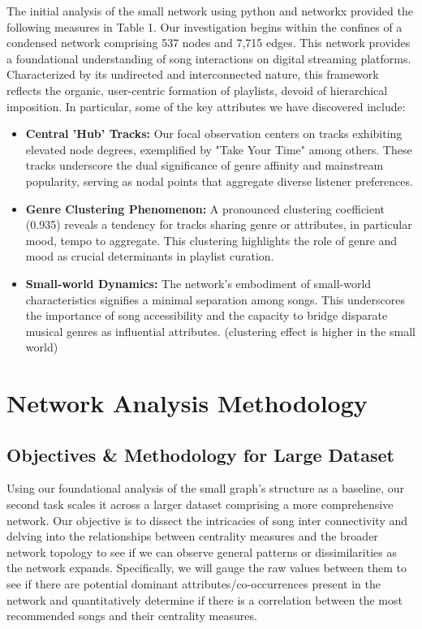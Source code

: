 \documentclass[conference]{IEEEtran}
\begin{document}
The initial analysis of the small network using python and networkx provided the following measures in Table 1. Our investigation begins within the confines of a condensed network comprising 537 nodes and 7,715 edges. This network provides a foundational understanding of song interactions on digital streaming platforms. Characterized by its undirected and interconnected nature, this framework reflects the organic, user-centric formation of playlists, devoid of hierarchical imposition. In particular, some of the key attributes we have discovered include: \\

\begin{itemize}
    \item\textbf{Central 'Hub' Tracks:} Our focal observation centers on tracks exhibiting elevated node degrees, exemplified by "Take Your Time" among others. These tracks underscore the dual significance of genre affinity and mainstream popularity, serving as nodal points that aggregate diverse listener preferences. \\
    
    \item\textbf{Genre Clustering Phenomenon:} A pronounced clustering coefficient (0.935) reveals a tendency for tracks sharing genre or attributes, in particular mood, tempo to aggregate. This clustering highlights the role of genre and mood as crucial determinants in playlist curation. \\
    
    \item\textbf{Small-world Dynamics:} The network's embodiment of small-world characteristics signifies a minimal separation among songs. This underscores the importance of song accessibility and the capacity to bridge disparate musical genres as influential attributes. (clustering effect is higher in the small world) \\
\end{itemize}


\section{Network Analysis Methodology}

\subsection{Objectives \& Methodology for Large Dataset}
Using our foundational analysis of the small graph's structure as a baseline, our second task scales it across a larger dataset comprising a more comprehensive network. Our objective is to dissect the intricacies of song inter connectivity and delving into the relationships between centrality measures and the broader network topology to see if we can observe general patterns or dissimilarities as the network expands. Specifically, we will gauge the raw values between them to see if there are potential dominant attributes/co-occurrences present in the network and quantitatively determine if there is a correlation between the most recommended songs and their centrality measures.
\end{document}
